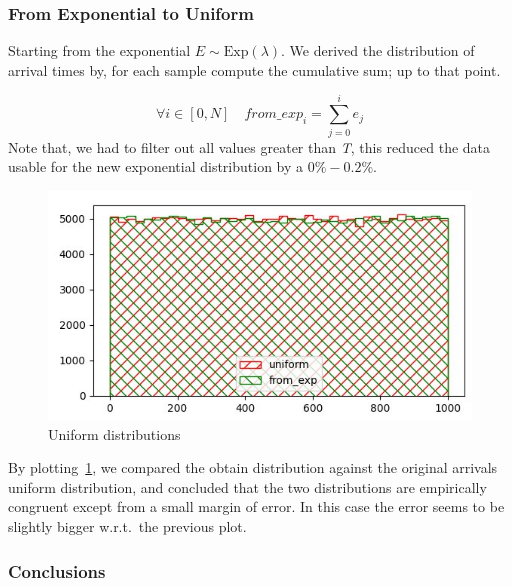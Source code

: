 \documentclass[10pt,a4paper]{article}
\begin{document}
\subsubsection*{From Exponential to Uniform}

Starting from the exponential \(E\sim\text{Exp}(\lambda)\). We derived the distribution of arrival times by, for each sample compute the cumulative sum; up to that point.

\begin{equation*}
  \forall i\in[0,N]\quad from\_exp_{i} =\sum_{j=0}^{i}{e_{j}}
\end{equation*}
Note that, we had to filter out all values greater than \emph{T}, this reduced the data usable for the new exponential distribution by a \(0\%-0.2\%\). %

\begin{figure}[h]
  \centering
  \includegraphics[scale=0.5]{es1-2.png}
  \caption{Uniform distributions}
  \label{fig:2}
\end{figure}

By plotting~\ref{fig:2}, we compared the obtain distribution against the original arrivals uniform distribution, and concluded that the two distributions are empirically congruent except from a small margin of error. In this case the error seems to be slightly bigger w.r.t.\ the previous plot.

\subsubsection*{Conclusions}

\end{document}
